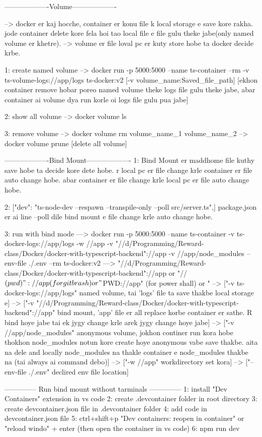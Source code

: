 -------------------Volume-------------------

--> docker er kaj hocche, container er konu file k local storage e save kore rakha. jode container delete kore fela hoi tao local file e file gulu theke jabe(only named volume er khetre).
--> volume er file loval pc er kuty store hobe ta docker decide krbe. 

1: create named volume
--> docker run -p 5000:5000 --name ts-container --rm -v ts-volume-logs://app/logs ts-docker:v2  [-v volume_name:Saved_file_path]
[ekhon container remove hobar poreo named volume theke logs file gulu theke jabe, abar container ai volume dya run korle oi logs file gulu pua jabe]

2: show all volume
--> docker volume ls

3: remove volume
--> docker volume rm volume_name_1 volume_name_2
--> docker volume prune [delete all volume]


-------------------Bind Mount-------------------
1: Bind Mount er maddhome file kuthy save hobe ta decide kore dete hobe. r local pc er file change krle container er file auto change hobe. abar container er file change krle local pc er file auto change hobe.

2: ["dev": "ts-node-dev --respawn --transpile-only --poll src/server.ts",]  package.json er ai line --poll dile bind mount e file change krle auto change hobe.

3: run with bind mode
---> docker run -p 5000:5000 --name ts-container -v ts-docker-logs://app/logs -w //app -v "//d/Programming/Reward-class/Docker/docker-with-typescript-backend"://app -v //app/node_modules --env-file ./.env --rm ts-docker:v2
---> "//d/Programming/Reward-class/Docker/docker-with-typescript-backend"://app or  "//$(pwd)"://app (for git brash) or "${PWD}://app" (for power shall) or "%
--> ["-v ts-docker-logs://app/logs" named volume, tai 'logs' file ta save thakbe local storage e]
--> ["-v "//d/Programming/Reward-class/Docker/docker-with-typescript-backend"://app" bind mount, 'app' file er all replace korbe container er sathe. R bind hoye jabe tai ek jygy change krle arek jygy change hoye jabe]
--> ["-v //app/node_modules" anonymous volume, jokhon continer run kora hobe thokhon node_modules notun kore create hoye anonymous vabe save thakbe. aita na dele and locally node_modules na thakle container e node_modules thakbe na (tai always ai command debo)]
--> ["-w //app" workdirectory set kora]
--> ["--env-file ./.env" declired env file location]


-------------- Run bind mount without tarminals --------------
1: install "Dev Containers" extension in vs code
2: create .devcontainer folder in root directory
3: create devcontainer.json file in .devcontainer folder
4: add code in devcontainer.json file
5: ctrl+shift+p "Dev containers: reopen in container" or "reload windo" + enter (then open the container in vs code)
6: npm run dev
